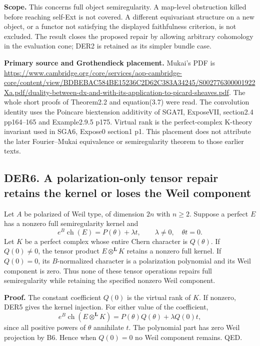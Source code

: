 \documentclass[11pt,a4paper]{article}
\theoremstyle{definition}
\begin{document}
\textbf{Scope.} This concerns full object semiregularity. A map-level
obstruction killed before reaching self-Ext is not covered. A different
equivariant structure on a new object, or a functor not satisfying the
displayed faithfulness criterion, is not excluded. The result closes the
proposed repair by allowing arbitrary cohomology in the evaluation cone;
DER2 is retained as its simpler bundle case.

\textbf{Primary source and Grothendieck placement.} Mukai's PDF is
\url{https://www.cambridge.org/core/services/aop-cambridge-core/content/view/BDBEBAC584BE15236C2D62C383A34245/S002776300001922Xa.pdf/duality-between-dx-and-with-its-application-to-picard-sheaves.pdf}.
The whole short proofs of Theorem2.2 and equation(3.7) were read. The
convolution identity uses the Poincare biextension additivity of SGA7I,
ExposeVII, section2.4 pp164--165 and Example2.9.5 p175. Virtual rank is
the perfect-complex K-theory invariant used in SGA6, Expose0 section1
p1. This placement does not attribute the later Fourier--Mukai
equivalence or semiregularity theorem to those earlier texts.

\subsection{DER6. A polarization-only tensor repair retains the kernel
or loses the Weil
component}\label{der6.-a-polarization-only-tensor-repair-retains-the-kernel-or-loses-the-weil-component}

Let \(A\) be polarized of Weil type, of dimension \(2n\) with \(n\ge2\).
Suppose a perfect \(E\) has a nonzero full semiregularity kernel and \[
 e^B\operatorname{ch}(E)=P(\theta)+\lambda t,
 \qquad\lambda\ne0,\quad\theta t=0.
\] Let \(K\) be a perfect complex whose entire Chern character is
\(Q(\theta)\). If \(Q(0)\ne0\), the tensor product
\(E\otimes^{\mathbf L}K\) retains a nonzero full kernel. If \(Q(0)=0\),
its \(B\)-normalized character is a polarization polynomial and its Weil
component is zero. Thus none of these tensor operations repairs full
semiregularity while retaining the specified nonzero Weil component.

\textbf{Proof.} The constant coefficient \(Q(0)\) is the virtual rank of
\(K\). If nonzero, DER5 gives the kernel injection. For either value of
the coefficient, \[
 e^B\operatorname{ch}(E\otimes^{\mathbf L}K)
 =P(\theta)Q(\theta)+\lambda Q(0)t,
\tag{DER6}
\] since all positive powers of \(\theta\) annihilate \(t\). The
polynomial part has zero Weil projection by B6. Hence when \(Q(0)=0\) no
Weil component remains. QED.
\end{document}
